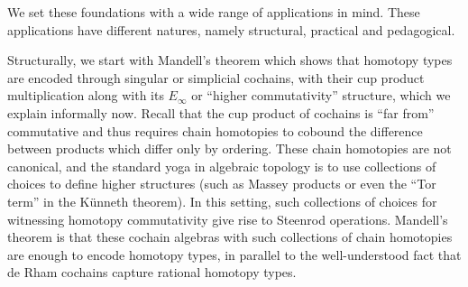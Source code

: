 
We set these foundations with a wide range of applications in mind.
These applications have different natures, namely structural, practical and pedagogical.

Structurally, we start with Mandell's theorem \cite{Mand01} which shows that homotopy types are encoded through singular or simplicial cochains, with their cup product multiplication along with its $E_\infty$ or ``higher commutativity'' structure, which we explain informally now.
Recall that the cup product of cochains is ``far from'' commutative and thus requires chain homotopies to cobound the difference between products which differ only by ordering.
These chain homotopies are not canonical, and the standard yoga in algebraic topology is to use collections of choices to define higher structures (such as Massey products or even the ``Tor term'' in the K\"unneth theorem).
In this setting, such collections of choices for witnessing homotopy commutativity give rise to Steenrod operations.
Mandell's theorem is that these cochain algebras with such collections of chain homotopies are enough to encode homotopy types, in parallel to the well-understood fact that de Rham cochains capture rational homotopy types.

